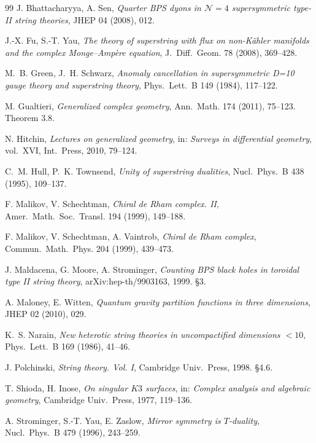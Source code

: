 \documentclass[11pt,reqno]{amsart}
\theoremstyle{plain}
\theoremstyle{definition}
\theoremstyle{remark}
\begin{document}
\begin{thebibliography}{99}
 J. Bhattacharyya, A. Sen, \emph{Quarter BPS dyons in $\mathcal{N}=4$ supersymmetric type-II string theories}, JHEP 04 (2008), 012.

 J.-X. Fu, S.-T. Yau, \emph{The theory of superstring with flux on non-K\"ahler manifolds and the complex Monge--Amp\`ere equation}, J.~Diff.~Geom. 78 (2008), 369--428.

 M.~B. Green, J.~H. Schwarz, \emph{Anomaly cancellation in supersymmetric D=10 gauge theory and superstring theory}, Phys.~Lett.~B 149 (1984), 117--122.

 M. Gualtieri, \emph{Generalized complex geometry}, Ann.~Math. 174 (2011), 75--123. Theorem 3.8.

 N. Hitchin, \emph{Lectures on generalized geometry}, in: \emph{Surveys in differential geometry}, vol.~XVI, Int.~Press, 2010, 79--124.

 C.~M. Hull, P.~K. Townsend, \emph{Unity of superstring dualities}, Nucl.~Phys.~B 438 (1995), 109--137.

 F. Malikov, V. Schechtman, \emph{Chiral de Rham complex. II}, Amer.~Math.~Soc.~Transl. 194 (1999), 149--188.

 F. Malikov, V. Schechtman, A. Vaintrob, \emph{Chiral de Rham complex}, Commun.~Math.~Phys. 204 (1999), 439--473.

 J. Maldacena, G. Moore, A. Strominger, \emph{Counting BPS black holes in toroidal type II string theory}, arXiv:hep-th/9903163, 1999. \S3.

 A. Maloney, E. Witten, \emph{Quantum gravity partition functions in three dimensions}, JHEP 02 (2010), 029.

 K.~S. Narain, \emph{New heterotic string theories in uncompactified dimensions $<10$}, Phys.~Lett.~B 169 (1986), 41--46.

 J. Polchinski, \emph{String theory. Vol. I}, Cambridge Univ.~Press, 1998. \S4.6.

 T. Shioda, H. Inose, \emph{On singular $K3$ surfaces}, in: \emph{Complex analysis and algebraic geometry}, Cambridge Univ.~Press, 1977, 119--136.

 A. Strominger, S.-T. Yau, E. Zaslow, \emph{Mirror symmetry is $T$-duality}, Nucl.~Phys.~B 479 (1996), 243--259.


\end{thebibliography}
\end{document}
